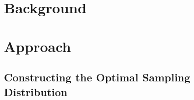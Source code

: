 \section{Background}


\section{Approach}

\subsection{Constructing the Optimal Sampling Distribution}


